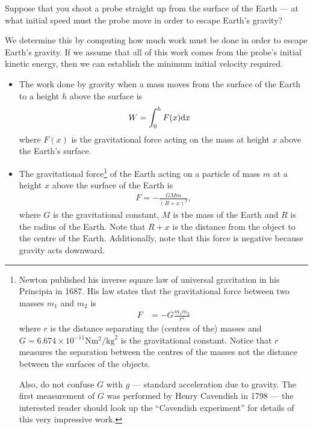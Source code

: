 \begin{eg}\label{eg:WKgravity}
Suppose that you shoot a probe straight up from the surface of the Earth --- at what
initial speed must the probe move in order to escape Earth's gravity?

\soln We determine this by computing how much work must be done in order to escape
Earth's gravity. If we assume that all of this work comes from the probe's initial
kinetic energy, then we can establish the minimum initial velocity required.

\begin{itemize}
 \item
The work done by gravity when a mass moves from the surface of
the Earth to a height $h$ above the surface is
\begin{align*}
  W &= \int_0^h F(x) \mathrm{d}x
\end{align*}
where $F(x)$ is the gravitational force acting on the mass at height $x$ above the
Earth's surface.

\item The gravitational force\footnote{Newton published his inverse square law of
universal gravitation in his Principia in 1687. His law states that the
gravitational force between two masses $m_1$ and $m_2$ is
\begin{align*}
  F &= -G \frac{m_1 m_2}{r^2}
\end{align*}
where $r$ is the distance separating the (centres of the) masses and $G=
6.674\times 10^{-11} \mathrm{N}\mathrm{m}^2/\mathrm{kg}^2$ is the gravitational constant.
Notice that $r$ measures the separation between the centres of the masses not the
distance between the surfaces of the objects.

Also, do not confuse $G$ with $g$ --- standard acceleration due to gravity. The first
measurement of $G$ was performed by Henry Cavendish in 1798 --- the interested reader
should look up the ``Cavendish experiment'' for details of this very impressive work.} of
the Earth acting on a particle of mass $m$ at a height $x$ above the surface of the Earth
is
\begin{align*}
F=-\frac{GMm}{(R+x)^2},
\end{align*}
where $G$ is the gravitational constant, $M$ is the mass of the Earth and
$R$ is the radius of the Earth. Note that $R+x$ is the distance from the object to
the centre of the Earth. Additionally, note that this force is negative because
gravity acts downward.


\end{itemize}
\end{eg}
